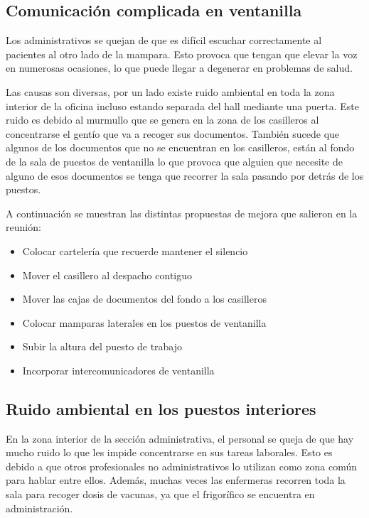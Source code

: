\subsection{Comunicación complicada en ventanilla}

Los administrativos se quejan de que es difícil escuchar correctamente al pacientes al otro lado de la mampara.
Esto provoca que tengan que elevar la voz en numerosas ocasiones, lo que puede llegar a degenerar en problemas de salud.

Las causas son diversas, por un lado existe ruido ambiental en toda la zona interior de la oficina incluso estando separada del hall mediante una puerta.
Este ruido es debido al murmullo que se genera en la zona de los casilleros al concentrarse el gentío que va a recoger sus documentos.
También sucede que algunos de los documentos que no se encuentran en los casilleros, están al fondo de la sala de puestos de ventanilla lo que provoca que alguien que necesite de alguno de esos documentos se tenga que recorrer la sala pasando por detrás de los puestos.

A continuación se muestran las distintas propuestas de mejora que salieron en la reunión:

\begin{itemize}
    \item Colocar cartelería que recuerde mantener el silencio
    \item Mover el casillero al despacho contiguo
    \item Mover las cajas de documentos del fondo a los casilleros
    \item Colocar mamparas laterales en los puestos de ventanilla
    \item Subir la altura del puesto de trabajo
    \item Incorporar intercomunicadores de ventanilla
\end{itemize}

\subsection{Ruido ambiental en los puestos interiores}

En la zona interior de la sección administrativa, el personal se queja de que hay mucho ruido lo que les impide concentrarse en sus tareas laborales.
Esto es debido a que otros profesionales no administrativos lo utilizan como zona común para hablar entre ellos.
Además, muchas veces las enfermeras recorren toda la sala para recoger dosis de vacunas, ya que el frigorífico se encuentra en administración.

